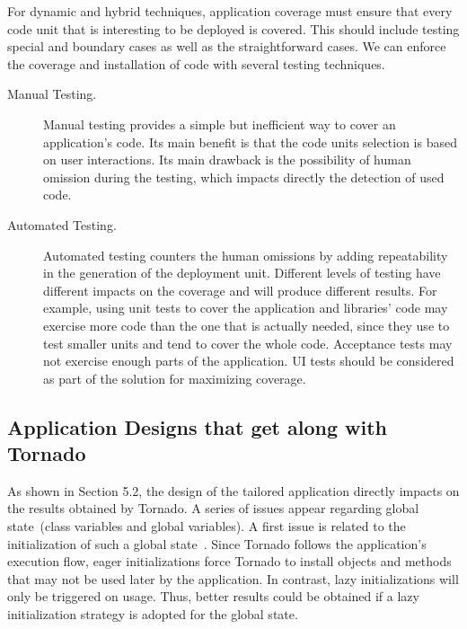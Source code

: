 For dynamic and hybrid techniques, application coverage must ensure that every code unit that is interesting to be deployed is covered. This should include testing special and boundary cases as well as the straightforward cases. We can enforce the coverage and installation of code with several testing techniques.

\begin{description}
\item[Manual Testing.] Manual testing provides a simple but inefficient way to cover an application's code. Its main benefit is that the code units selection is based on user interactions. Its main drawback is the possibility of human omission during the testing, which impacts directly the detection of used code. 
\item[Automated Testing.] Automated testing counters the human omissions by adding repeatability in the generation of the deployment unit. Different levels of testing have different impacts on the coverage and will produce different results. For example, using unit tests to cover the application and libraries' code may exercise more code than the one that is actually needed, since they use to test smaller units and tend to cover the whole code. Acceptance tests may not exercise enough parts of the application. UI tests should be considered as part of the solution for maximizing coverage.
\end{description}


\subsection{Application Designs that get along with Tornado} As shown in Section 5.2, the design of the tailored application directly impacts on the results obtained by Tornado. A series of issues appear regarding global state~(\eg class variables and global variables). A first issue is related to the initialization of such a global state~\cite{Unga95a}. Since Tornado follows the application's execution flow, eager initializations force Tornado to install objects and methods that may not be used later by the application. In contrast, lazy initializations will only be triggered on usage. Thus, better results could be obtained if a lazy initialization strategy is adopted for the global state.

